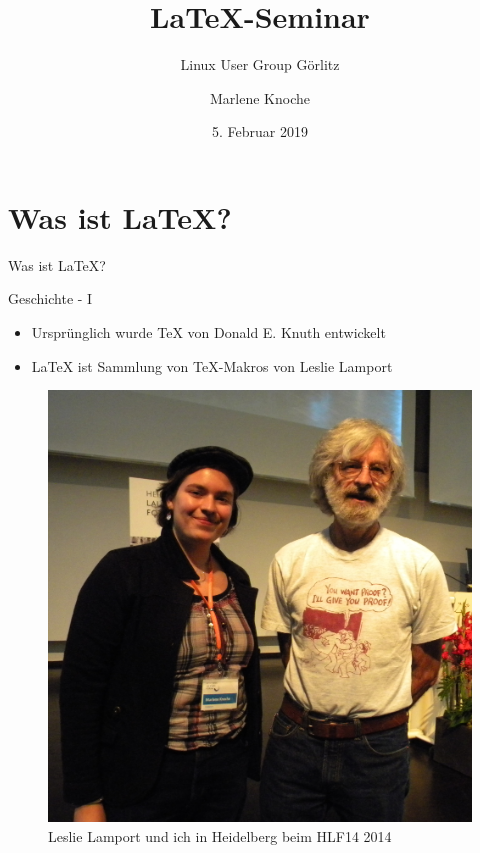 \documentclass{beamer}
\author{Marlene Knoche}
\title{\LaTeX-Seminar}
\subtitle{Linux User Group Görlitz}
\date{5. Februar 2019}
\begin{document}
\begin{frame}

\maketitle

\end{frame}

\begin{frame}

\tableofcontents

\end{frame}

\section{Was ist \LaTeX?}

\begin{frame}
\centering
\huge{Was ist \LaTeX?}
\end{frame}

\begin{frame}{Geschichte - I}
\begin{itemize}
\item Ursprünglich wurde \TeX\; von Donald E. Knuth entwickelt
\item \LaTeX\; ist Sammlung von \TeX-Makros von Leslie Lamport 
\end{itemize}

\begin{figure}
\centering
\includegraphics[scale=0.5]{pics/leslielamport.jpg}
\caption{Leslie Lamport und ich in Heidelberg beim HLF14 2014}
\end{figure}
\end{frame}
\end{document}
